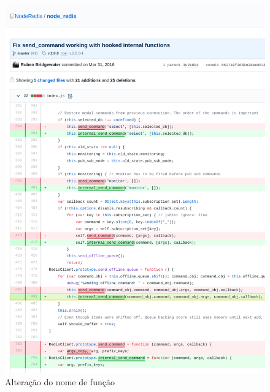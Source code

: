\begin{itemize}
    \begin{figure}
        \centering
        \includegraphics{figuras/bc_category_renamed_function.pdf}
        \caption{Alteração do nome de função}
        \label{fig:bc_category_renamed_function}
    \end{figure}{}


\end{itemize}
